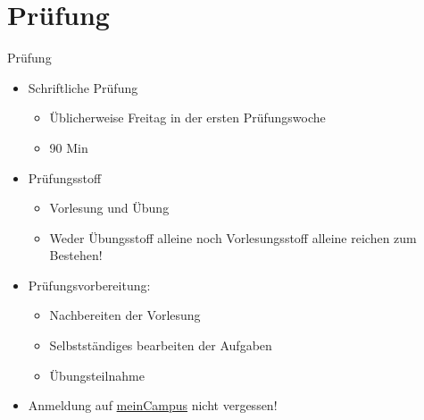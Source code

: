 %
%

\section{Prüfung} \sectionpage
\Large
\begin{frame}{Prüfung}
\begin{itemize}
\item Schriftliche Prüfung
\begin{itemize}
\item Üblicherweise Freitag in der ersten Prüfungswoche
\item 90 Min
\end{itemize}
\item Prüfungsstoff
\begin{itemize}
\item Vorlesung \alert{und} Übung
\item Weder Übungsstoff alleine noch Vorlesungsstoff alleine reichen zum Bestehen!
\end{itemize}
\item Prüfungsvorbereitung:
\begin{itemize}
\item Nachbereiten der Vorlesung
\item Selbstständiges bearbeiten der Aufgaben
\item Übungsteilnahme
\end{itemize}
\item Anmeldung auf \href{https://www.campus.fau.de/}{meinCampus} nicht vergessen!
\end{itemize}
\end{frame}

\begin{frame}[c]
\begin{center}
\end{center}
\end{frame}



